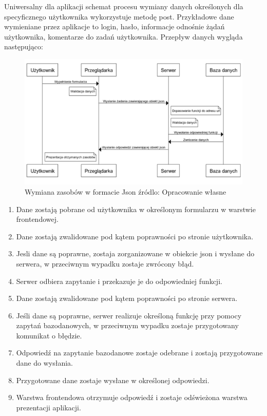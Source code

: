 \documentclass[12pt]{report}
\begin{document}
 Uniwersalny dla aplikacji schemat procesu wymiany danych określonych dla specyficznego użytkownika wykorzystuje metodę post. Przykładowe dane wymieniane przez aplikacje to login, hasło, informacje odnośnie żądań użytkownika, komentarze do zadań użytkownika. Przepływ danych wygląda następująco:
 \begin{figure}[!hb]
\centering
\includegraphics[width=\textwidth,height=\textheight,keepaspectratio]{U-P-S-B.png} 
\caption{Wymiana zasobów w formacie Json źródlo: Opracowanie własne}
\end{figure}
\begin{enumerate}
\item Dane zostają pobrane od użytkownika w określonym formularzu w warstwie frontendowej.
\item Dane zostają zwalidowane pod kątem poprawności po stronie użytkownika.
\item Jesli dane są poprawne, zostaja zorganizowane w obiekcie json i wysłane do serwera, w przeciwnym wypadku zostaje zwrócony błąd.
\item Serwer odbiera zapytanie i przekazuje je do odpowiedniej funkcji.
\item Dane zostają zwalidowane pod kątem poprawności po stronie serwera.
\item Jeśli dane są poprawne, serwer realizuje określoną funkcję przy pomocy zapytań bazodanowych, w przeciwnym wypadku zostaje przygotowany komunikat o błędzie.
\item Odpowiedź na zapytanie bazodanowe zostaje odebrane i zostają przygotowane dane do wysłania.
\item Przygotowane dane zostaje wysłane w określonej odpowiedzi.
\item Warstwa frontendowa otrzymuje odpowiedź i zostaje odświeżona warstwa prezentacji aplikacji.
\end{enumerate}
 
\end{document}
